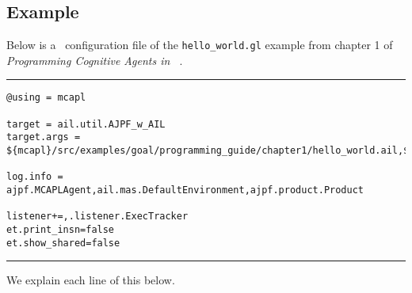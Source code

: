 \subsection{Example}
Below is a \jpf\ configuration file of the \texttt{hello\_world.gl} example from chapter 1 of \emph{Programming Cognitive Agents in \goal\ }.

\noindent\rule{\textwidth}{1pt}
\begin{small}
\begin{verbatim}
@using = mcapl

target = ail.util.AJPF_w_AIL
target.args = ${mcapl}/src/examples/goal/programming_guide/chapter1/hello_world.ail,${mcapl}/src/examples/goal/programming_guide/chapter1/simple.psl,1

log.info = ajpf.MCAPLAgent,ail.mas.DefaultEnvironment,ajpf.product.Product

listener+=,.listener.ExecTracker
et.print_insn=false
et.show_shared=false
\end{verbatim}
\end{small}
\rule{\textwidth}{1pt}

We explain each line of this below.

